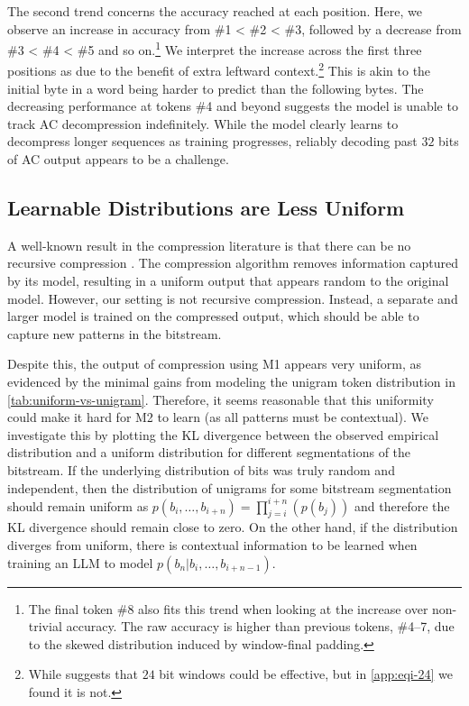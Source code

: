 The second trend concerns the accuracy reached at each position. Here, we observe an increase in accuracy from \#1 < \#2 < \#3, followed by a decrease from \#3 < \#4 < \#5 and so on.\footnote{The final token \#8 also fits this trend when looking at the increase over non-trivial accuracy. The raw accuracy is higher than previous tokens, \#4--7, due to the skewed distribution induced by window-final padding.} We interpret the increase across the first three positions as due to the benefit of extra leftward context.\footnote{While suggests that $24$ bit windows could be effective, but in \ref{app:eqi-24} we found it is not.} This is akin to the initial byte in a word being harder to predict than the following bytes. The decreasing performance at tokens \#4 and beyond suggests the model is unable to track AC decompression indefinitely. While the model clearly learns to decompress longer sequences as training progresses, reliably decoding past $32$ bits of AC output appears to be a challenge. 

\subsection{Learnable Distributions are Less Uniform}

A well-known result in the compression literature is that there can be no recursive compression \cite{mahoneyDataCompressionExplained2013}. The compression algorithm removes information captured by its model, resulting in a uniform output that appears random to the original model. However, our setting is not recursive compression. Instead, a separate and larger model is trained on the compressed output, which should be able to capture new patterns in the bitstream.

Despite this, the output of compression using M1 appears very uniform, as evidenced by the minimal gains from modeling the unigram token distribution in \ref{tab:uniform-vs-unigram}. Therefore, it seems reasonable that this uniformity could make it hard for M2 to learn (as all patterns must be contextual). We investigate this by plotting the KL divergence \cite{kullbackInformationSufficiency1951} between the observed empirical distribution and a uniform distribution for different segmentations of the bitstream. If the underlying distribution of bits was truly random and independent, then the distribution of unigrams for some bitstream segmentation should remain uniform as $p(b_i, \dots, b_{i+n}) = \prod_{j=i}^{i+n}(p(b_j))$ and therefore the KL divergence should remain close to zero. On the other hand, if the distribution diverges from uniform, there is contextual information to be learned when training an LLM to model $p(b_n | b_i, \dots, b_{i + n - 1})$.

